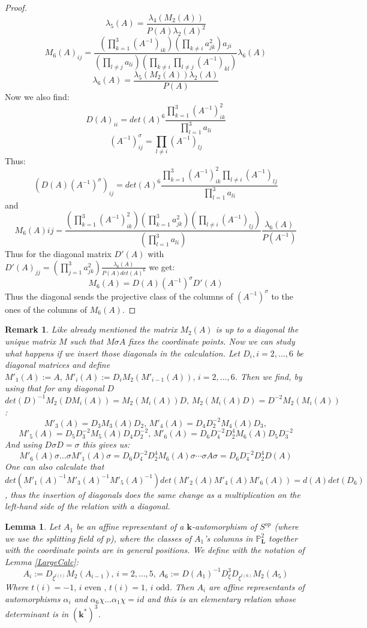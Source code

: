 \documentclass[12pt, oneside, reqno]{amsart}
\newtheorem{lemma}[theorem]{Lemma}
\newtheorem{remark}[theorem]{Remark}
\begin{document}
\begin{proof}
    \[\lambda_5(A) = \frac{\lambda_4(M_2(A))}{P(A) \lambda_2(A)^2}\]
    \[M_6(A)_{ij} = \frac{(\prod_{k=1}^3(A^{-1})_{ik}) (\prod_{k \neq i}a_{jk}^2)a_{ji}}{(\prod_{l \neq j}a_{li}) (\prod_{k \neq i} \prod_{l \neq j}(A^{-1})_{kl})} \lambda_6(A)\]
    \[\lambda_6(A) = \frac{\lambda_5(M_2(A)) \lambda_2(A)}{P(A)}\]
    Now we also find:
    \[D(A)_{ii} = det(A)^6\frac{\prod_{k=1}^3(A^{-1})_{ik}^2}{\prod_{l=1}^3a_{li}}\]
    \[(A^{-1})^{\sigma}_{ij} = \prod_{l \neq i} (A^{-1})_{lj}\]
    Thus:
    \[(D(A)(A^{-1})^{\sigma})_{ij} = det(A)^6\frac{\prod_{k=1}^3(A^{-1})_{ik}^2\prod_{l \neq i} (A^{-1})_{lj}}{\prod_{l=1}^3a_{li}}\]
    and
    \[M_6(A){ij} = \frac{(\prod_{k=1}^3(A^{-1})^2_{ik}) (\prod_{k = 1}^3a_{jk}^2)(\prod_{l \neq i}(A^{-1})_{lj})}{(\prod_{l = 1}^3a_{li})} \frac{\lambda_6(A)}{P(A^{-1})}\]
    Thus for the diagonal matrix $D'(A)$ with $D'(A)_{jj} = (\prod_{j=1}^3a_{jk}^2) \frac{\lambda_6(A)}{P(A)det(A)^6}$ we get:
    \[M_6(A) = D(A) (A^{-1})^{\sigma}D'(A)\]
    Thus the diagonal sends the projective class of the columns of $(A^{-1})^{\sigma}$ to the ones of the columns of $M_6(A)$.
\end{proof}
\begin{remark} \label{RemDiag}
    Like already mentioned the matrix $M_2(A)$ is up to a diagonal the unique matrix $M$ such that $M \sigma A$ fixes the coordinate points. Now we can study what happens if we insert those diagonals in the calculation. Let $D_i, i=2, \dots ,6$ be diagonal matrices and define $M'_1(A) := A, \, M'_i(A) := D_i M_2(M'_{i-1}(A)), \, i = 2, \dots , 6$. Then we find, by using that for any diagonal $D$ $det(D)^{-1}M_2(DM_i(A)) = M_2(M_i(A))D, \, M_2(M_i(A)D) = D^{-2}M_2(M_i(A))$: 
    \[M'_3(A) = D_3 M_3(A) D_2, \, M'_4(A) = D_4 D_2^{-2} M_4(A)D_3, \] \[ M'_5(A) = D_5D_3^{-2}M_5(A)D_4D_2^{-2}, \, M'_6(A) = D_6 D_4^{-2}D_2^4 M_6(A)D_5D_3^{-2}\]
    And using $D \sigma D = \sigma$ this gives us:
    \[M'_6(A) \sigma \dots \sigma M'_1(A)\sigma = D_6 D_4^{-2}D_2^4 M_6(A) \sigma \dotsm \sigma A \sigma = D_6 D_4^{-2}D_2^4 D(A)\]
    One can also calculate that $det(M'_1(A)^{-1}M'_3(A)^{-1}M'_5(A)^{-1})det(M'_2(A)M'_4(A)M'_6(A)) = d(A) det(D_6)$, thus the insertion of diagonals does the same change as a multiplication on the left-hand side of the relation with a diagonal.
\end{remark}
\begin{lemma} \label{TrivEx}
    Let $A_1$ be an affine representant of a $\textbf{k}$-automorphism of $S^{op}$ (where we use the splitting field of $p$), where the classes of $A_1$'s columns in $\mathbb{P}^2_{\textbf{L}}$  together with the coordinate points are in general positions. We define with the notation of Lemma \ref{LargeCalc}: 
    \[A_i := D_{\xi^{t(i)}}M_2(A_{i-1}), \, i=2, \dots , 5 , \, A_6 := D(A_1)^{-1}D_{\xi}^3D_{\xi^{t(6)}}M_2(A_5)\]
    Where $t(i) = -1, \, i \text{ even }, \, t(i) = 1 , \, i \text{ odd}$. Then $A_i$ are affine representants of automorphisms $\alpha_i$ and $\alpha_6 \chi \dots \alpha_1 \chi = id$ and this is an elementary relation whose determinant is in $(\textbf{k}^*)^3$.
\end{lemma}
\end{document}
